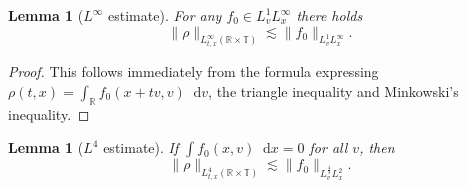 \documentclass[11pt,a4paper,reqno]{amsart}
\theoremstyle{plain}
\newtheorem{lemma}[theorem]{Lemma}
\theoremstyle{remark}
\newcommand{\dd}{\mathop{}\!\mathrm{d}}
\begin{document}
\begin{lemma}[$L^\infty$ estimate]
\label{lemmaLinf}
For any $f_0 \in L^1_v L^\infty_x$ there holds 
\[
    \| \rho \|_{L^\infty_{t,x}(\mathbb{R} \times \mathbb{T})} \lesssim \| f_0 \|_{L^1_v L^\infty_x}.
\]
\end{lemma}

\begin{proof} 
This follows immediately from the formula expressing $\rho (t,x) = \int_{\mathbb{R}} f_0(x+tv,v)\dd v$, the triangle inequality and Minkowski's inequality. 
\end{proof}

\begin{lemma}[$L^4$ estimate]
\label{lemmaL4}
If $\int f_0(x,v) \dd x = 0$ for all $v$, then
\[
    \| \rho \|_{L^4_{t,x}(\mathbb{R} \times \mathbb{T})} \lesssim \| f_0 \|_{L^{\frac 43}_v L^2_x}.
\]
\end{lemma} 
\end{document}
